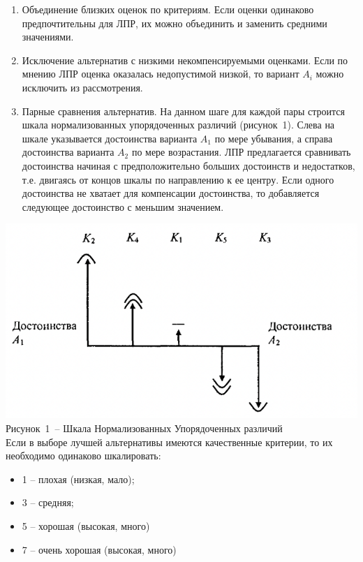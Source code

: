 \documentclass[a4paper, 14pt]{report}
\begin{document}
	\begin{enumerate} 
		\item Объединение близких оценок по критериям. Если оценки одинаково предпочтительны для ЛПР, их можно объединить и заменить средними значениями. 
		
		\item 	Исключение альтернатив с низкими некомпенсируемыми оценками.  Если по мнению ЛПР оценка оказалась недопустимой низкой, то вариант $A_{i}$ можно исключить из рассмотрения.
		
		\item 	Парные сравнения альтернатив. На данном шаге для каждой пары строится шкала нормализованных упорядоченных различий (рисунок~1).  Слева на шкале указывается достоинства варианта $A_{1}$ по мере убывания, а справа достоинства варианта $A_{2}$ по мере возрастания. ЛПР предлагается сравнивать достоинства начиная с предположительно больших достоинств и недостатков, т.е. двигаясь от концов шкалы по направлению к ее центру. Если одного достоинства не хватает для компенсации достоинства, то добавляется следующее достоинство с меньшим значением. 
	\end{enumerate}


	\includegraphics[scale=0.8]{1}\\
	{Рисунок~1~– Шкала Нормализованных Упорядоченных различий}\\





	Если в выборе лучшей альтернативы имеются качественные критерии, то их необходимо одинаково шкалировать:
	\begin{itemize}
		\item1 – плохая (низкая, мало);
		\item3 – средняя;
		\item5 – хорошая (высокая, много)
		\item7 – очень хорошая (высокая, много)
	\end{itemize}
\end{document}
